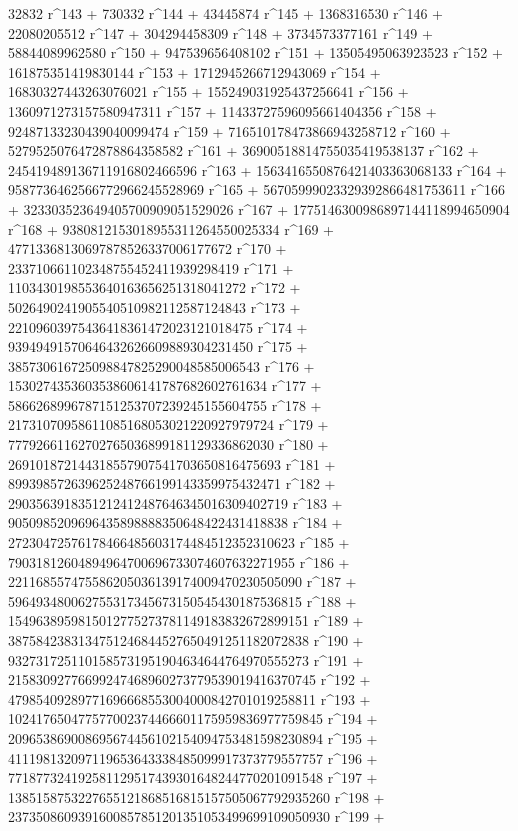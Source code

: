        32832 r^143 + 730332 r^144 + 43445874 r^145 + 
       1368316530 r^146 + 22080205512 r^147 + 304294458309 r^148 + 
       3734573377161 r^149 + 58844089962580 r^150 + 
       947539656408102 r^151 + 13505495063923523 r^152 + 
       161875351419830144 r^153 + 1712945266712943069 r^154 + 
       16830327443263076021 r^155 + 155249031925437256641 r^156 + 
       1360971273157580947311 r^157 + 11433727596095661404356 r^158 + 
       92487133230439040099474 r^159 + 
       716510178473866943258712 r^160 + 
       5279525076472878864358582 r^161 + 
       36900518814755035419538137 r^162 + 
       245419489136711916802466596 r^163 + 
       1563416550876421403363068133 r^164 + 
       9587736462566772966245528969 r^165 + 
       56705999023329392866481753611 r^166 + 
       323303523649405700909051529026 r^167 + 
       1775146300986897144118994650904 r^168 + 
       9380812153018955311264550025334 r^169 + 
       47713368130697878526337006177672 r^170 + 
       233710661102348755452411939298419 r^171 + 
       1103430198553640163656251318041272 r^172 + 
       5026490241905540510982112587124843 r^173 + 
       22109603975436418361472023121018475 r^174 + 
       93949491570646432626609889304231450 r^175 + 
       385730616725098847825290048585006543 r^176 + 
       1530274353603538606141787682602761634 r^177 + 
       5866268996787151253707239245155604755 r^178 + 
       21731070958611085168053021220927979724 r^179 + 
       77792661162702765036899181129336862030 r^180 + 
       269101872144318557907541703650816475693 r^181 + 
       899398572639625248766199143359975432471 r^182 + 
       2903563918351212412487646345016309402719 r^183 + 
       9050985209696435898888350648422431418838 r^184 + 
       27230472576178466485603174484512352310623 r^185 + 
       79031812604894964700696733074607632271955 r^186 + 
       221168557475586205036139174009470230505090 r^187 + 
       596493480062755317345673150545430187536815 r^188 + 
       1549638959815012775273781149183832672899151 r^189 + 
       3875842383134751246844527650491251182072838 r^190 + 
       9327317251101585731951904634644764970555273 r^191 + 
       21583092776699247468960273779539019416370745 r^192 + 
       47985409289771696668553004000842701019258811 r^193 + 
       102417650477577002374466601175959836977759845 r^194 + 
       209653869008695674456102154094753481598230894 r^195 + 
       411198132097119653643338485099917373779557757 r^196 + 
       771877324192581129517439301648244770201091548 r^197 + 
       1385158753227655121868516815157505067792935260 r^198 + 
       2373508609391600857851201351053499699109050930 r^199 + 
